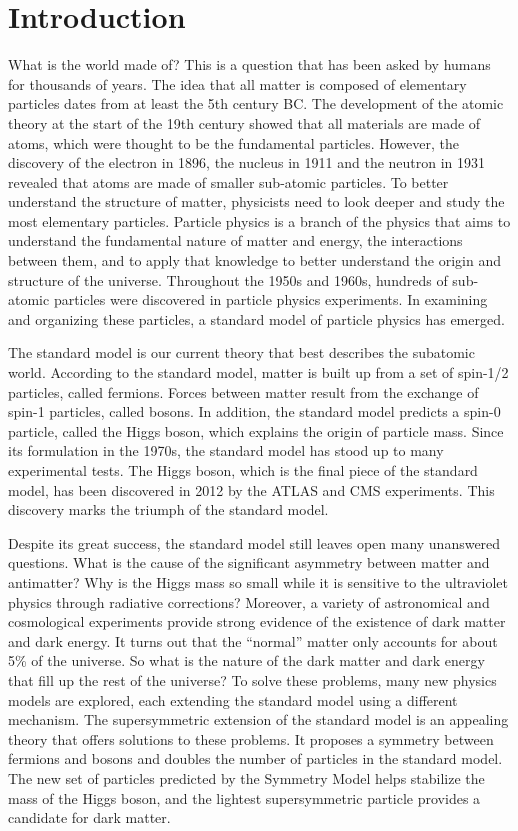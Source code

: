 \documentclass[12pt,oneside]{memoir}
\begin{document}

\chapter{Introduction}
What is the world made of? This is a question that has been asked by humans for thousands of years. 
The idea that all matter is composed of elementary particles dates from at least the 5th century BC. 
The development of the atomic theory at the start of the 19th century showed that all materials are 
made of atoms, which were thought to be the fundamental particles. However, the discovery of the electron 
in 1896, the nucleus in 1911 and the neutron in 1931 revealed that atoms are made of smaller sub-atomic particles. 
To better understand the structure of matter, physicists need to look deeper and study the most elementary particles. 
Particle physics is a branch of the physics that aims to understand the fundamental nature of matter and energy, 
the interactions between them, and to apply that knowledge to better understand the origin and structure of the universe. 
Throughout the 1950s and 1960s, hundreds of sub-atomic particles were discovered in particle physics experiments.
In examining and organizing these particles, a standard model of particle physics has emerged.

The standard model is our current theory that best describes the subatomic world. 
According to the standard model, matter is built up from a set of spin-1/2 particles, called fermions. 
Forces between matter result from the exchange of spin-1 particles, called bosons. 
In addition, the standard model predicts a spin-0 particle, called the Higgs boson, which explains the origin of particle mass. 
Since its formulation in the 1970s, the standard model has stood up to many experimental tests. 
The Higgs boson, which is the final piece of the standard model, has been discovered in 2012 by the ATLAS and CMS experiments. 
This discovery marks the triumph of the standard model. 

Despite its great success, the standard model still leaves open many unanswered questions. 
What is the cause of the significant asymmetry between matter and antimatter? 
Why is the Higgs mass so small while it is sensitive to the ultraviolet physics through radiative corrections?
Moreover, a variety of astronomical and cosmological experiments provide strong evidence of the existence of dark matter and dark energy. 
It turns out that the ``normal'' matter only accounts for about 5\% of the universe. 
So what is the nature of the dark matter and dark energy that fill up the rest of the universe? 
To solve these problems, many new physics models are explored, each extending the standard model using a different mechanism. 
The supersymmetric extension of the standard model is an appealing theory that offers solutions to these problems.
It proposes a symmetry between fermions and bosons and doubles the number of particles in the standard model. 
The new set of particles predicted by the Symmetry Model helps stabilize the mass of the Higgs boson, and the lightest supersymmetric particle provides a candidate for dark matter. 
\end{document}
